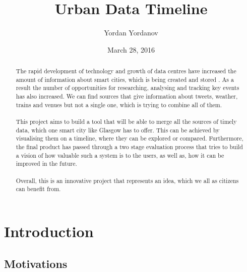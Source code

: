 \documentclass{l4proj}
\begin{document}
\title{Urban Data Timeline}
\author{Yordan Yordanov}
\date{March 28, 2016}
\maketitle

\begin{abstract}
\paragraph{}
The rapid development of technology and growth of data centres have increased the amount of information about smart cities, which is being created and stored . As a result the number of opportunities for researching, analysing and tracking key events has also increased. We can find sources that give information about tweets, weather, trains and venues but not a single one, which is trying to combine all of them. 
\paragraph{}
This project aims to build a tool that will be able to merge all the sources of timely data, which one smart city like Glasgow has to offer. This can be achieved by visualising them on a timeline, where they can be explored or compared. Furthermore, the final product has passed through a two stage evaluation process that tries to build a vision of how valuable such a system is to the users, as well as, how it can be improved in the future. 
\paragraph{}
Overall, this is an innovative project that represents an idea, which we all as citizens can benefit from. 
\end{abstract}

\educationalconsent
%
%
\tableofcontents

\chapter{Introduction}

\section{Motivations}
\end{document}
